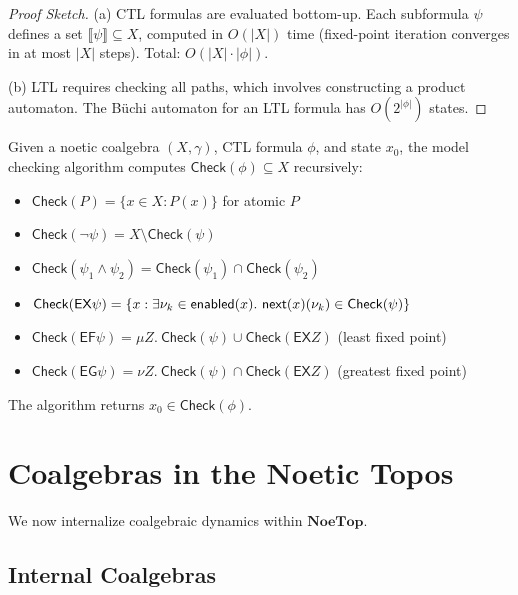 \begin{proof}[Proof Sketch]
(a) CTL formulas are evaluated bottom-up. Each subformula $\psi$ defines a set
$\llbracket \psi \rrbracket \subseteq X$, computed in $O(|X|)$ time (fixed-point
iteration converges in at most $|X|$ steps). Total: $O(|X| \cdot |\phi|)$.

(b) LTL requires checking all paths, which involves constructing a product
automaton. The B\"uchi automaton for an LTL formula has $O(2^{|\phi|})$ states.
\end{proof}

\begin{definition}
\label{alg:ctl-model-check}
Given a noetic coalgebra $(X, \gamma)$, CTL formula $\phi$, and state $x_0$,
the model checking algorithm computes $\mathsf{Check}(\phi) \subseteq X$ recursively:
\begin{itemize}
  \item $\mathsf{Check}(P) = \{x \in X : P(x)\}$ for atomic $P$
  \item $\mathsf{Check}(\neg\psi) = X \setminus \mathsf{Check}(\psi)$
  \item $\mathsf{Check}(\psi_1 \land \psi_2) = \mathsf{Check}(\psi_1) \cap \mathsf{Check}(\psi_2)$
  \item $\mathsf{Check}(\mathsf{EX}\psi) = \{x : \exists \nu_{k} \in \mathsf{enabled}(x).\ \mathsf{next}(x)(\nu_{k}) \in \mathsf{Check}(\psi)\}$
  \item $\mathsf{Check}(\mathsf{EF}\psi) = \mu Z.\ \mathsf{Check}(\psi) \cup \mathsf{Check}(\mathsf{EX}Z)$ (least fixed point)
  \item $\mathsf{Check}(\mathsf{EG}\psi) = \nu Z.\ \mathsf{Check}(\psi) \cap \mathsf{Check}(\mathsf{EX}Z)$ (greatest fixed point)
\end{itemize}
The algorithm returns $x_0 \in \mathsf{Check}(\phi)$.
\end{definition}

\section{Coalgebras in the Noetic Topos}
\label{sec:coalgebras-topos}

We now internalize coalgebraic dynamics within $\mathbf{NoeTop}$.

\subsection{Internal Coalgebras}
\label{subsec:internal-coalgebras}

